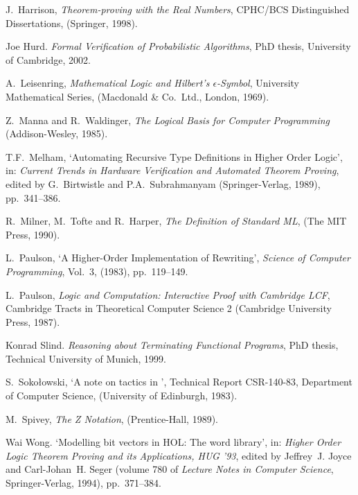 \begin{thebibliography}{99}
J.\ Harrison,
{\it Theorem-proving with the Real Numbers},
{\rm CPHC/BCS Distinguished Dissertations},
(Springer, 1998).

Joe Hurd.
{\it Formal Verification of Probabilistic Algorithms},
{\rm PhD thesis, University of Cambridge, 2002}.

A.\ Leisenring,
{\it Mathematical Logic and Hilbert's $\epsilon$-Symbol\/},
{\rm University Mathematical Series},
(Macdonald \& Co.\ Ltd., London, 1969).

Z.\ Manna and R.\ Waldinger,
{\it The Logical Basis for Computer Programming\/}
(Addison-Wesley, 1985).

T{}.F{}.\ Melham, `{}Automating Recursive Type Definitions
in Higher Order Logic',
in: {\it Current Trends in Hardware Verification and
Automated Theorem Proving\/}, edited by G.\ Birtwistle
and P.A.\ Subrahmanyam
(Springer-Verlag, 1989), pp.\ 341--386.

R.\ Milner, M.\ Tofte and R.\ Harper,
{\it The Definition of Standard ML\/},
(The MIT Press, 1990).

L.\ Paulson,
`{}A Higher-Order Implementation of Rewriting',
{\it Science of Computer Programming}, Vol.\ 3, (1983), pp.\ 119--149.

 L.\ Paulson,
{\it Logic and Computation: Interactive Proof with Cambridge LCF},
Cambridge Tracts in Theoretical Computer Science 2
(Cambridge University Press, 1987).

Konrad Slind.
{\it Reasoning about Terminating Functional Programs},
{\rm PhD thesis, Technical University of Munich, 1999}.

%
S.\ Soko\l owski, `{}A note on tactics in \LCF',
Technical Report CSR-140-83, Department of Computer Science,
(University of Edinburgh, 1983).


M.\ Spivey,
{\it The Z Notation}, (Prentice-Hall, 1989).

Wai Wong.
`Modelling bit vectors in {HOL}: The word library',
in: {\em Higher
  Order Logic Theorem Proving and its Applications, {HUG} '93}, edited
by Jeffrey~J. Joyce and Carl-Johan~H. Seger (volume 780 of
  {\em Lecture Notes in Computer Science}, Springer-Verlag, 1994),
  pp.~371--384.


\end{thebibliography}



